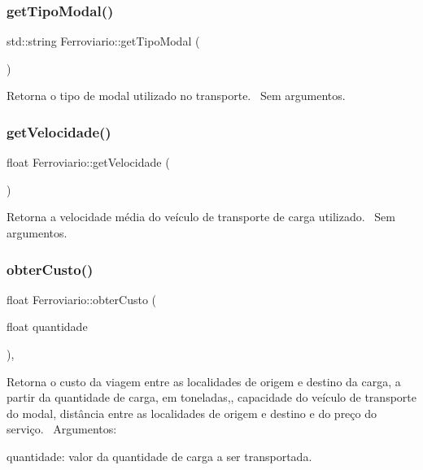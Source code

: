 \subsubsection{\texorpdfstring{get\+Tipo\+Modal()}{getTipoModal()}}
{\footnotesize\ttfamily std\+::string Ferroviario\+::get\+Tipo\+Modal (\begin{DoxyParamCaption}{ }\end{DoxyParamCaption})}

Retorna o tipo de modal utilizado no transporte.~\newline
Sem argumentos.\mbox{\label{classFerroviario_a643ac2394764eb83835e63088f116ac4}} 
\subsubsection{\texorpdfstring{get\+Velocidade()}{getVelocidade()}}
{\footnotesize\ttfamily float Ferroviario\+::get\+Velocidade (\begin{DoxyParamCaption}{ }\end{DoxyParamCaption})}

Retorna a velocidade média do veículo de transporte de carga utilizado.~\newline
Sem argumentos.\mbox{\label{classFerroviario_a691452311fe49e6573e47220fa372d15}} 
\subsubsection{\texorpdfstring{obter\+Custo()}{obterCusto()}}
{\footnotesize\ttfamily float Ferroviario\+::obter\+Custo (\begin{DoxyParamCaption}\item[{float}]{quantidade }\end{DoxyParamCaption})\hspace{0.3cm}{\ttfamily [override]}, {\ttfamily [virtual]}}

Retorna o custo da viagem entre as localidades de origem e destino da carga, a partir da quantidade de carga, em toneladas,, capacidade do veículo de transporte do modal, distância entre as localidades de origem e destino e do preço do serviço.~\newline
Argumentos\+:
\begin{DoxyItemize}
\item quantidade\+: valor da quantidade de carga a ser transportada.
\end{DoxyItemize}

